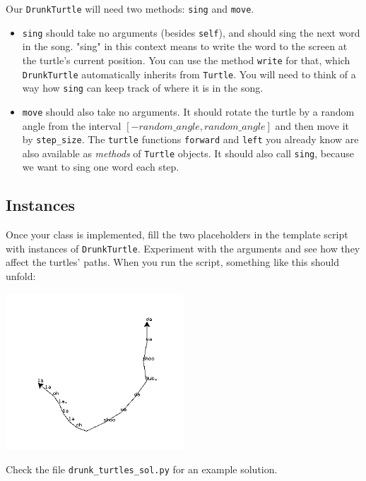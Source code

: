Our {\tt DrunkTurtle} will need two methods: {\tt sing} and {\tt move}.

\begin{itemize}
    \item {\tt sing} should take no arguments (besides {\tt self}), and should sing the next word in the song. "sing" in this context means to write the word to the screen at the turtle's current position. You can use the method {\tt write} for that, which {\tt DrunkTurtle} automatically inherits from {\tt Turtle}. You will need to think of a way how {\tt sing} can keep track of where it is in the song.

    \item {\tt move} should also take no arguments. It should rotate the turtle by a random angle from the interval $[-random\_angle, random\_angle]$ and then move it by {\tt step\_size}. The {\tt turtle} functions {\tt forward} and {\tt left} you already know are also available as {\it methods} of {\tt Turtle} objects. It should also call {\tt sing}, because we want to sing one word each step.
\end{itemize}

\subsection{Instances}

Once your class is implemented, fill the two placeholders in the template script with instances of {\tt DrunkTurtle}. Experiment with the arguments and see how they affect the turtles' paths. When you run the script, something like this should unfold:

\begin{center}
    \includegraphics[width=0.5\textwidth]{09_OOP/drunk_turtles.png}
\end{center}

\vspace{1em}

\begin{solution}
    Check the file {\tt drunk\_turtles\_sol.py} for an example solution.
\end{solution}


